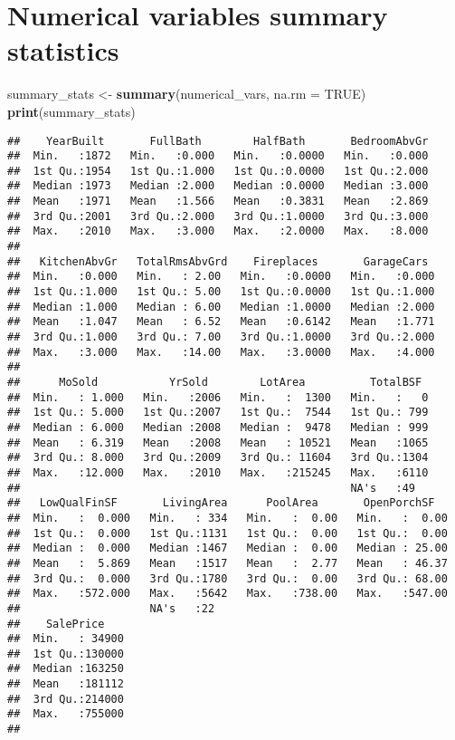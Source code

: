\documentclass[
]{article}
\newenvironment{Shaded}{\begin{snugshade}}{\end{snugshade}}
\newcommand{\AttributeTok}[1]{\textcolor[rgb]{0.13,0.29,0.53}{#1}}
\newcommand{\ConstantTok}[1]{\textcolor[rgb]{0.56,0.35,0.01}{#1}}
\newcommand{\FunctionTok}[1]{\textcolor[rgb]{0.13,0.29,0.53}{\textbf{#1}}}
\newcommand{\NormalTok}[1]{#1}
\newcommand{\OtherTok}[1]{\textcolor[rgb]{0.56,0.35,0.01}{#1}}
\begin{document}
\hypertarget{numerical-variables-summary-statistics}{%
\section{Numerical variables summary
statistics}\label{numerical-variables-summary-statistics}}

\begin{Shaded}
\begin{Highlighting}[]
\NormalTok{summary\_stats }\OtherTok{\textless{}{-}} \FunctionTok{summary}\NormalTok{(numerical\_vars, }\AttributeTok{na.rm =} \ConstantTok{TRUE}\NormalTok{)}
\FunctionTok{print}\NormalTok{(summary\_stats)}
\end{Highlighting}
\end{Shaded}

\begin{verbatim}
##    YearBuilt       FullBath        HalfBath       BedroomAbvGr  
##  Min.   :1872   Min.   :0.000   Min.   :0.0000   Min.   :0.000  
##  1st Qu.:1954   1st Qu.:1.000   1st Qu.:0.0000   1st Qu.:2.000  
##  Median :1973   Median :2.000   Median :0.0000   Median :3.000  
##  Mean   :1971   Mean   :1.566   Mean   :0.3831   Mean   :2.869  
##  3rd Qu.:2001   3rd Qu.:2.000   3rd Qu.:1.0000   3rd Qu.:3.000  
##  Max.   :2010   Max.   :3.000   Max.   :2.0000   Max.   :8.000  
##                                                                 
##   KitchenAbvGr   TotalRmsAbvGrd    Fireplaces       GarageCars   
##  Min.   :0.000   Min.   : 2.00   Min.   :0.0000   Min.   :0.000  
##  1st Qu.:1.000   1st Qu.: 5.00   1st Qu.:0.0000   1st Qu.:1.000  
##  Median :1.000   Median : 6.00   Median :1.0000   Median :2.000  
##  Mean   :1.047   Mean   : 6.52   Mean   :0.6142   Mean   :1.771  
##  3rd Qu.:1.000   3rd Qu.: 7.00   3rd Qu.:1.0000   3rd Qu.:2.000  
##  Max.   :3.000   Max.   :14.00   Max.   :3.0000   Max.   :4.000  
##                                                                  
##      MoSold           YrSold        LotArea          TotalBSF   
##  Min.   : 1.000   Min.   :2006   Min.   :  1300   Min.   :   0  
##  1st Qu.: 5.000   1st Qu.:2007   1st Qu.:  7544   1st Qu.: 799  
##  Median : 6.000   Median :2008   Median :  9478   Median : 999  
##  Mean   : 6.319   Mean   :2008   Mean   : 10521   Mean   :1065  
##  3rd Qu.: 8.000   3rd Qu.:2009   3rd Qu.: 11604   3rd Qu.:1304  
##  Max.   :12.000   Max.   :2010   Max.   :215245   Max.   :6110  
##                                                   NA's   :49    
##   LowQualFinSF       LivingArea      PoolArea       OpenPorchSF    
##  Min.   :  0.000   Min.   : 334   Min.   :  0.00   Min.   :  0.00  
##  1st Qu.:  0.000   1st Qu.:1131   1st Qu.:  0.00   1st Qu.:  0.00  
##  Median :  0.000   Median :1467   Median :  0.00   Median : 25.00  
##  Mean   :  5.869   Mean   :1517   Mean   :  2.77   Mean   : 46.37  
##  3rd Qu.:  0.000   3rd Qu.:1780   3rd Qu.:  0.00   3rd Qu.: 68.00  
##  Max.   :572.000   Max.   :5642   Max.   :738.00   Max.   :547.00  
##                    NA's   :22                                      
##    SalePrice     
##  Min.   : 34900  
##  1st Qu.:130000  
##  Median :163250  
##  Mean   :181112  
##  3rd Qu.:214000  
##  Max.   :755000  
## 
\end{verbatim}
\end{document}

